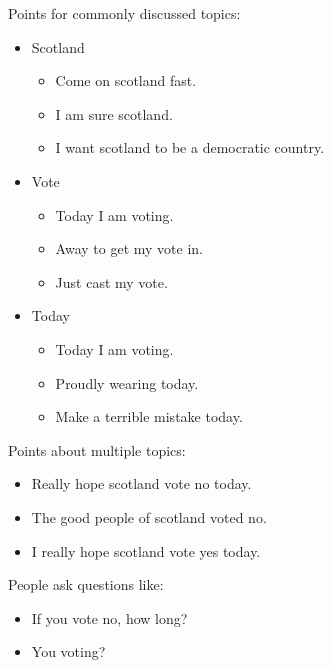 \documentclass[tikz]{article}
\begin{document}
\begin{multicols}{2}
    Points for commonly discussed topics:
    \begin{itemize}[noitemsep,nolistsep,label={}]
      \item{Scotland}
        \begin{itemize}[noitemsep,nolistsep,label={}]
		\item{Come on scotland fast.}
		\item{I am sure scotland.}
		\item{I want scotland to be a democratic country.}
        \end{itemize}
      \item{Vote}
        \begin{itemize}[noitemsep,nolistsep,label={}]
		\item{Today I am voting.}
		\item{Away to get my vote in.}
		\item{Just cast my vote.}
        \end{itemize}
      \item{Today}
        \begin{itemize}[noitemsep,nolistsep,label={}]
		\item{Today I am voting.}
		\item{Proudly wearing today.}
		\item{Make a terrible mistake today.}
        \end{itemize}
    \end{itemize}

    Points about multiple topics:
    \begin{itemize}[noitemsep,nolistsep,label={}]
		\item{Really hope scotland vote no today.}
		\item{The good people of scotland voted no.}
		\item{I really hope scotland vote yes today.}
    \end{itemize}

    People ask questions like:
    \begin{itemize}[noitemsep,nolistsep,label={}]
		\item{If you vote no, how long?}
		\item{You voting?}
    \end{itemize}

    \vfill
    \columnbreak


\end{multicols}
\end{document}
